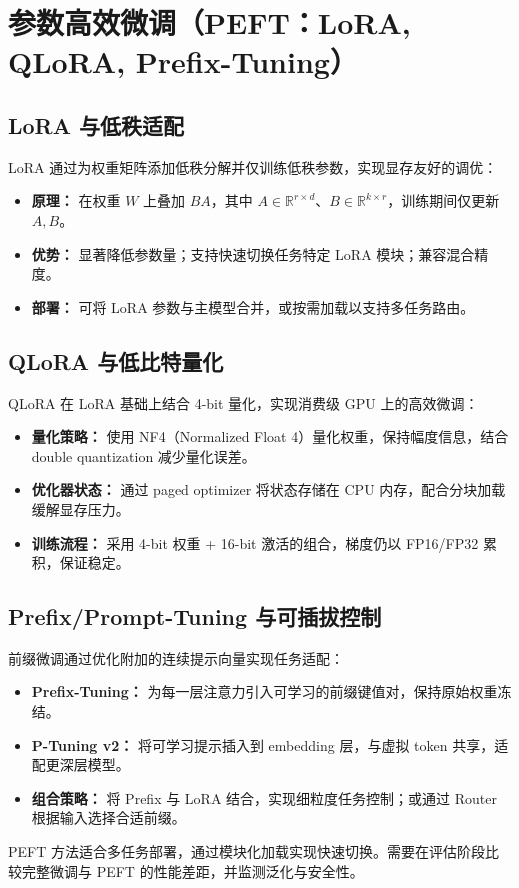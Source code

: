 \documentclass[UTF8,zihao=-4]{ctexart}
\begin{document}
\section{参数高效微调（PEFT：LoRA, QLoRA, Prefix-Tuning）}
\subsection{LoRA 与低秩适配}
LoRA 通过为权重矩阵添加低秩分解并仅训练低秩参数，实现显存友好的调优：
\begin{itemize}
  \item \textbf{原理：} 在权重 $W$ 上叠加 $BA$，其中 $A \in \mathbb{R}^{r \times d}$、$B \in \mathbb{R}^{k \times r}$，训练期间仅更新 $A,B$。
  \item \textbf{优势：} 显著降低参数量；支持快速切换任务特定 LoRA 模块；兼容混合精度。
  \item \textbf{部署：} 可将 LoRA 参数与主模型合并，或按需加载以支持多任务路由。
\end{itemize}

\subsection{QLoRA 与低比特量化}
QLoRA 在 LoRA 基础上结合 4-bit 量化，实现消费级 GPU 上的高效微调：
\begin{itemize}
  \item \textbf{量化策略：} 使用 NF4（Normalized Float 4）量化权重，保持幅度信息，结合 double quantization 减少量化误差。
  \item \textbf{优化器状态：} 通过 paged optimizer 将状态存储在 CPU 内存，配合分块加载缓解显存压力。
  \item \textbf{训练流程：} 采用 4-bit 权重 + 16-bit 激活的组合，梯度仍以 FP16/FP32 累积，保证稳定。
\end{itemize}

\subsection{Prefix/Prompt-Tuning 与可插拔控制}
前缀微调通过优化附加的连续提示向量实现任务适配：
\begin{itemize}
  \item \textbf{Prefix-Tuning：} 为每一层注意力引入可学习的前缀键值对，保持原始权重冻结。
  \item \textbf{P-Tuning v2：} 将可学习提示插入到 embedding 层，与虚拟 token 共享，适配更深层模型。
  \item \textbf{组合策略：} 将 Prefix 与 LoRA 结合，实现细粒度任务控制；或通过 Router 根据输入选择合适前缀。
\end{itemize}
PEFT 方法适合多任务部署，通过模块化加载实现快速切换。需要在评估阶段比较完整微调与 PEFT 的性能差距，并监测泛化与安全性。
\end{document}
